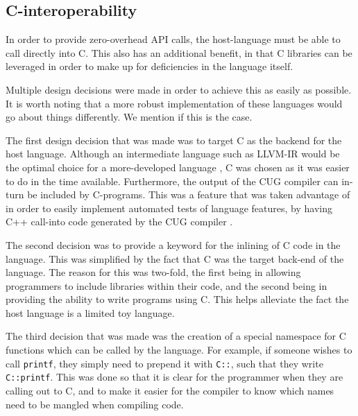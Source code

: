 \documentclass[a4paper,12pt,twoside,openright]{report}
\begin{document}

\subsection{C-interoperability}

In order to provide zero-overhead API calls, the host-language must be able to
call directly into C. This also has an additional benefit, in that C libraries
can be leveraged in order to make up for deficiencies in the language itself.

Multiple design decisions were made in order to achieve this as easily as
possible. It is worth noting that a more robust implementation of these
languages would go about things differently. We mention if this is the case.

The first design decision that was made was to target C as the backend for the
host language. Although an intermediate language such as LLVM-IR would be the
optimal choice for a more-developed language \cite{TODO}, C was chosen as it
was easier to do in the time available. Furthermore, the output of the CUG
compiler can in-turn be included by C-programs. This was a feature that was
taken advantage of in order to easily implement automated tests of language
features, by having C++ call-into code generated by the CUG compiler
\cite{AutomatedTestCode} \cite{AutomatedTestOutput}.

The second decision was to provide a keyword for the inlining of C code in the
language. This was simplified by the fact that C was the target back-end of the
language. The reason for this was two-fold, the first being in allowing
programmers to include libraries within their code, and the second being in
providing the ability to write programs using C. This helps alleviate the fact
the host language is a limited toy language.

The third decision that was made was the creation of a special namespace for C
functions which can be called by the language. For example, if someone wishes
to call \texttt{printf}, they simply need to prepend it with \texttt{C::}, such
that they write \texttt{C::printf}. This was done so that it is clear for the
programmer when they are calling out to C, and to make it easier for the
compiler to know which names need to be mangled when compiling code.
\end{document}
